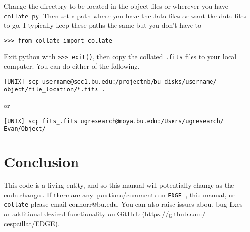 \documentclass{article}
\newcommand{\edge}{\texttt{EDGE }}
\begin{document}
Change the directory to be located in the object files or wherever you have \texttt{collate.py}. Then set a path where you have the data files or want the data files to go. I typically keep these paths the same but you don’t have to 

\vspace{2mm}
\texttt{>>> from collate import collate}
\vspace{2mm}

Exit python with \texttt{>>> exit()}, then copy the collated \texttt{.fits} files to your local computer.  You can do either of the following.

\vspace{2mm}
\texttt{[UNIX] scp username@scc1.bu.edu:/projectnb/bu-disks/username/}\\
\texttt{object/file\_location/*.fits .} 
\vspace{2mm}

or

\vspace{2mm}
\texttt{[UNIX] scp fits\_.fits ugresearch@moya.bu.edu:/Users/ugresearch/}\\
\texttt{Evan/Object/}
\vspace{2mm}


\section{Conclusion}
 
This code is a living entity, and so this manual will potentially change as the code changes. If there are any questions/comments on \edge, this manual, or \texttt{collate} please email connorr@bu.edu. You can also raise issues about bug fixes or additional desired functionality on GitHub (https://github.com/ cespaillat/EDGE). 
\end{document}
